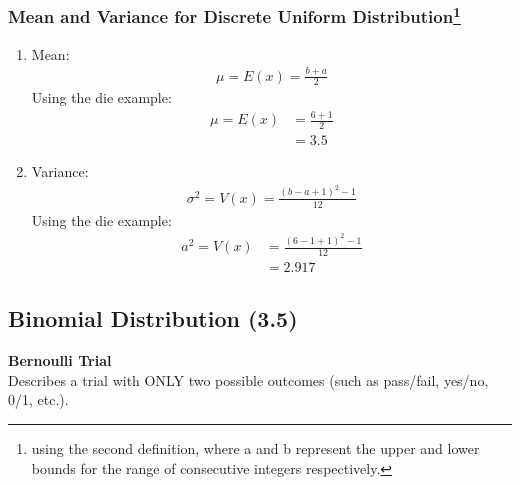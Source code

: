 \documentclass[../INDE315.tex]{subfiles}
\begin{document}
\subsubsection*{Mean and Variance for Discrete Uniform Distribution\footnote{using the second definition, where a and b represent the upper and lower bounds for the range of consecutive integers respectively.}}
\begin{enumerate}
    \item Mean:
        \begin{equation*}
            \begin{aligned}
                \mu = E(x) = \frac{b + a}{2}
            \end{aligned}
        \end{equation*}
        Using the die example:
        \begin{equation*}
            \begin{aligned}
                \mu = E(x) &= \frac{6 + 1}{2} \\
                        &= 3.5
            \end{aligned}
        \end{equation*}
    \item Variance:
        \begin{equation*}
            \begin{aligned}
                \sigma ^2 = V(x) = \frac{(b - a + 1)^2 - 1}{12}
            \end{aligned}
        \end{equation*}
        Using the die example:
        \begin{equation*}
            \begin{aligned}
                a ^2 = V(x) &= \frac{(6 - 1 + 1)^2 - 1}{12} \\
                        &= 2.917
            \end{aligned}
        \end{equation*}
\end{enumerate}

\subsection*{Binomial Distribution (3.5)}
\begin{defn}
    \textbf{Bernoulli Trial} \\
    Describes a trial with ONLY two possible outcomes (such as pass/fail, yes/no, 0/1, etc.).
\end{defn}
\end{document}
